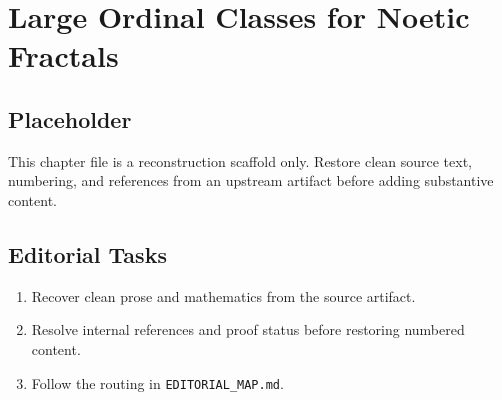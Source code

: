 \chapter{Large Ordinal Classes for Noetic Fractals}
\label{chap:large-ordinal-classes-for-noetic-fractals}

\section*{Placeholder}
This chapter file is a reconstruction scaffold only. Restore clean source text, numbering, and references from an upstream artifact before adding substantive content.

\section*{Editorial Tasks}
\begin{enumerate}
\item Recover clean prose and mathematics from the source artifact.
\item Resolve internal references and proof status before restoring numbered content.
\item Follow the routing in \texttt{EDITORIAL\_MAP.md}.
\end{enumerate}
